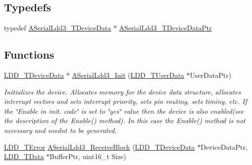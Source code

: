 \subsection*{Typedefs}
\begin{DoxyCompactItemize}
\item 
typedef \hyperlink{struct_a_serial_ldd3___t_device_data}{A\+Serial\+Ldd3\+\_\+\+T\+Device\+Data} $\ast$ \hyperlink{group___a_serial_ldd3__module_gac731e0d4eaeba8a8d2edc8b2c578b3f7}{A\+Serial\+Ldd3\+\_\+\+T\+Device\+Data\+Ptr}
\end{DoxyCompactItemize}
\subsection*{Functions}
\begin{DoxyCompactItemize}
\item 
\hyperlink{group___p_e___types__module_gac5cf1362f1f0e3a2ce71b1bf2276d091}{L\+D\+D\+\_\+\+T\+Device\+Data} $\ast$ \hyperlink{group___a_serial_ldd3__module_gaf10d297c3b0e8a880d6f9104b2dc1b4d}{A\+Serial\+Ldd3\+\_\+\+Init} (\hyperlink{group___p_e___types__module_ga0b66a73f87238a782318aa0be7578e35}{L\+D\+D\+\_\+\+T\+User\+Data} $\ast$User\+Data\+Ptr)
\begin{DoxyCompactList}\small\item\em Initializes the device. Allocates memory for the device data structure, allocates interrupt vectors and sets interrupt priority, sets pin routing, sets timing, etc. If the \char`\"{}\+Enable
    in init. code\char`\"{} is set to \char`\"{}yes\char`\"{} value then the device is also enabled(see the description of the Enable() method). In this case the Enable() method is not necessary and needn\textquotesingle{}t to be generated. \end{DoxyCompactList}\item 
\hyperlink{group___p_e___types__module_ga24c2b045fd04e79e85f261ce4df35588}{L\+D\+D\+\_\+\+T\+Error} \hyperlink{group___a_serial_ldd3__module_ga3704f50ad90a9538f51e489a9ad13450}{A\+Serial\+Ldd3\+\_\+\+Receive\+Block} (\hyperlink{group___p_e___types__module_gac5cf1362f1f0e3a2ce71b1bf2276d091}{L\+D\+D\+\_\+\+T\+Device\+Data} $\ast$Device\+Data\+Ptr, \hyperlink{group___p_e___types__module_gade8ef9401405bd941b6da738b807f980}{L\+D\+D\+\_\+\+T\+Data} $\ast$Buffer\+Ptr, uint16\+\_\+t Size)

\end{DoxyCompactItemize}
